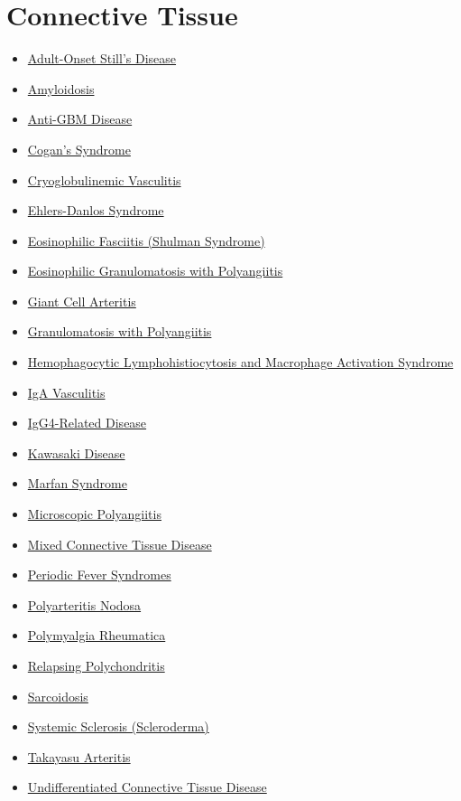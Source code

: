 \section*{Connective Tissue}
\label{sec:organ_connective}
\begin{itemize}[noitemsep]
  \item \hyperlink{sec:Adult-Onset Still's Disease (AOSD)}{Adult-Onset Still's Disease}
  \item \hyperlink{sec:Amyloidosis}{Amyloidosis}
  \item \hyperlink{sec:Anti-GBM Disease (Goodpasture Syndrome)}{Anti-GBM Disease}
  \item \hyperlink{sec:Cogan's Syndrome}{Cogan's Syndrome}
  \item \hyperlink{sec:Cryoglobulinemic Vasculitis}{Cryoglobulinemic Vasculitis}
  \item \hyperlink{sec:Ehlers-Danlos Syndrome}{Ehlers-Danlos Syndrome}
  \item \hyperlink{sec:Eosinophilic Fasciitis (Shulman Syndrome)}{Eosinophilic Fasciitis (Shulman Syndrome)}
  \item \hyperlink{sec:Eosinophilic Granulomatosis with Polyangiitis (EGPA)}{Eosinophilic Granulomatosis with Polyangiitis}
  \item \hyperlink{sec:Giant Cell Arteritis}{Giant Cell Arteritis}
  \item \hyperlink{sec:Granulomatosis with Polyangiitis (GPA)}{Granulomatosis with Polyangiitis}
  \item \hyperlink{sec:Hemophagocytic Lymphohistiocytosis (HLH)}{Hemophagocytic Lymphohistiocytosis and Macrophage Activation Syndrome}
  \item \hyperlink{sec:IgA Vasculitis (Henoch-Schönlein Purpura)}{IgA Vasculitis}
  \item \hyperlink{sec:IgG4-Related Disease}{IgG4-Related Disease}
  \item \hyperlink{sec:Kawasaki Disease}{Kawasaki Disease}
  \item \hyperlink{sec:Marfan Syndrome}{Marfan Syndrome}
  \item \hyperlink{sec:Microscopic Polyangiitis (MPA)}{Microscopic Polyangiitis}
  \item \hyperlink{sec:Mixed Connective Tissue Disease}{Mixed Connective Tissue Disease}
  \item \hyperlink{sec:Periodic Fever Syndromes}{Periodic Fever Syndromes}
  \item \hyperlink{sec:Polyarteritis Nodosa}{Polyarteritis Nodosa}
  \item \hyperlink{sec:Polymyalgia Rheumatica}{Polymyalgia Rheumatica}
  \item \hyperlink{sec:Relapsing Polychondritis}{Relapsing Polychondritis}
  \item \hyperlink{sec:Sarcoidosis (Systemic)}{Sarcoidosis}
  \item \hyperlink{sec:Systemic Sclerosis (Scleroderma)}{Systemic Sclerosis (Scleroderma)}
  \item \hyperlink{sec:Takayasu Arteritis}{Takayasu Arteritis}
  \item \hyperlink{sec:Undifferentiated Connective Tissue Disease}{Undifferentiated Connective Tissue Disease}
\end{itemize}

